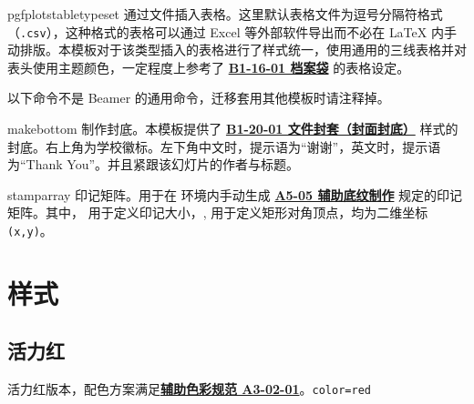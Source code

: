 \documentclass[a4paper,12pt]{article}
\begin{document}
\begin{CJK}{UTF8}{song}
\begin{docCommand*}[]{pgfplotstabletypeset}{}
    通过文件插入表格。这里默认表格文件为逗号分隔符格式（\verb".csv"），这种格式的表格可以通过 Excel 等外部软件导出而不必在 \LaTeX{} 内手动排版。本模板对于该类型插入的表格进行了样式统一，使用通用的三线表格并对表头使用主题颜色，一定程度上参考了 \href{https://vi.sjtu.edu.cn/index.php/articles/app/7}{\textbf{B1-16-01 档案袋}} 的表格设定。
\end{docCommand*}

以下命令不是 \textsf{Beamer} 的通用命令，迁移套用其他模板时请注释掉。

\begin{docCommand*}[]{makebottom}{}
    制作封底。本模板提供了 \href{https://vi.sjtu.edu.cn/index.php/articles/app/7}{\textbf{B1-20-01 文件封套（封面封底）}} 样式的封底。右上角为学校徽标。左下角中文时，提示语为“谢谢”，英文时，提示语为``Thank You''。并且紧跟该幻灯片的作者与标题。
\end{docCommand*}

\begin{docCommand*}[]{stamparray}{}
    印记矩阵。用于在  环境内手动生成 \href{http://vi.sjtu.edu.cn/index.php/articles/base/5}{\textbf{A5-05 辅助底纹制作}} 规定的印记矩阵。其中， 用于定义印记大小，, 用于定义矩形对角顶点，均为二维坐标 \verb"(x,y)"。 
\end{docCommand*}

\newpage
\section{样式}

\subsection{活力红}

活力红版本，配色方案满足\href{http://vi.sjtu.edu.cn/index.php/articles/base/3}{\textbf{辅助色彩规范 A3-02-01}}。\hfill\texttt{color=red}

\begin{tcbraster}[raster columns=3,colframe=red,colback=white,
    colbacktitle=red!50!white,fonttitle=\small\bfseries\ttfamily,
    left=0pt,right=0pt,top=0pt,bottom=0pt,boxsep=0pt,boxrule=0.6pt,
    toptitle=1mm,bottomtitle=1mm,drop lifted shadow,center title,
    graphics pages={1,...,12}]
\end{tcbraster}


\end{CJK}
\end{document}
